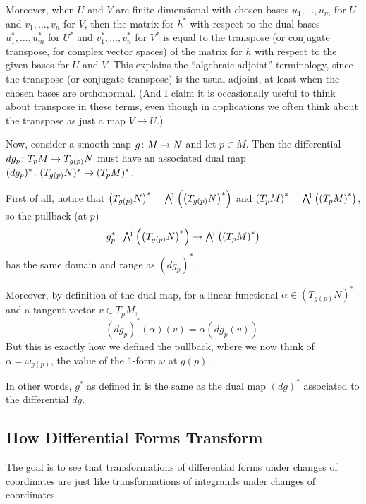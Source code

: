 Moreover, when $U$ and $V$ are finite-dimensional with chosen bases $u_1, \dots , u_m$ for $U$ and $v_1, \dots , v_n$ for $V$, then the matrix for $h^\ast$ with respect to the dual bases $u_1^\ast, \dots , u_m^\ast$ for $U^\ast$ and $v_1^\ast , \dots , v_n^\ast$ for $V^\ast$ is equal to the transpose (or conjugate transpose, for complex vector spaces) of the matrix for $h$ with respect to the given bases for $U$ and $V$. This explains the ``algebraic adjoint'' terminology, since the transpose (or conjugate transpose) is the usual adjoint, at least when the chosen bases are orthonormal. (And I claim it is occasionally useful to think about transpose in these terms, even though in applications we often think about the transpose as just a map $V \to U$.)

Now, consider a smooth map $g \colon\thinspace\! M \to N$ and let $p \in M$. Then the differential $dg_p \colon\thinspace\! T_pM \to T_{g(p)}N$ must have an associated dual map $(dg_p)^\ast \colon\thinspace\! (T_{g(p)}N)^\ast \to (T_pM)^\ast$.

First of all, notice that $\left(T_{g(p)}N\right)^\ast = \ext{1}\left(\left(T_{g(p)}N\right)^\ast\right)$ and $\left(T_pM\right)^\ast = \ext{1}\left(\left(T_pM\right)^\ast\right)$, so the pullback (at $p$)
\[
	g_p^\ast \from \ext{1}\left(\left(T_{g(p)}N\right)^\ast\right)\to \ext{1}\left(\left(T_pM\right)^\ast\right)
\]
has the same domain and range as $(dg_p)^\ast$.

Moreover, by definition of the dual map, for a linear functional $\alpha \in (T_{g(p)}N)^\ast$ and a tangent vector $v \in T_pM$,
\[
	(dg_p)^\ast (\alpha)(v) = \alpha(dg_p(v)).
\]
But this is exactly how we defined the pullback, where we now think of $\alpha = \omega_{g(p)}$, the value of the 1-form $\omega$ at $g(p)$.

In other words, $g^\ast$ as defined in  is the same as the dual map $(dg)^\ast$ associated to the differential $dg$.

\subsection{How Differential Forms Transform} 
\label{sub:how_differential_forms_transform}

The goal is to see that transformations of differential forms under changes of coordinates are just like transformations of integrands under changes of coordinates.

